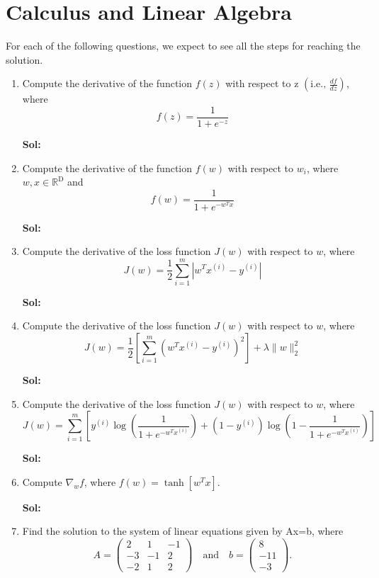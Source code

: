 \documentclass[11pt]{article}
\begin{document}
\section{Calculus and Linear Algebra}

 For each of the following questions, we expect to see all the steps for reaching the solution.
	
\begin{enumerate}
\item Compute the derivative of the function $f(z)$ with respect to z $\left(\text{i.e., }\frac{df}{dz}\right)$, where $$f(z) = \frac{1}{1+e^{-z}}$$

\textbf{Sol:}
  
  \newpage

\item Compute the derivative of the function $f(w)$ with respect to $w_i$, where $w, x \in \mathbb{R}^\text{D}$ and $$f(w) = \frac{1}{1+e^{-w^Tx}}$$

\textbf{Sol:}
  
  \newpage

\item Compute the derivative of the loss function $J(w)$ with respect to $w$, where 
$$ J(w) = \frac{1}{2}\sum_{i=1}^{m} \left|w^{T}x^{(i)} - y^{(i)}\right| $$

\textbf{Sol:}
  
  \newpage

\item Compute the derivative of the loss function $J(w)$ with respect to $w$, where 
$$ J(w) = \frac{1}{2}\left[ \sum_{i=1}^{m} \left(w^{T}x^{(i)} - y^{(i)}\right)^2 \right] + \lambda \|w\|^2_2 $$ 

\textbf{Sol:}
  
  \newpage

\item Compute the derivative of the loss function $J(w)$ with respect to $w$, where 
$$ J(w) = \sum_{i=1}^{m} \left[y^{(i)} \log \left(\frac{1}{1 + e^{-w^{T}x^{(i)}}}\right) + \left(1 - y^{(i)}\right) \log \left(1- \frac{1}{1 + e^{-w^{T}x^{(i)}}}\right)\right] $$

\textbf{Sol:}
  
  \newpage

\item Compute $\nabla_wf$, where $f(w) = \tanh \left[w^Tx\right]$.

\textbf{Sol:}
  
  \newpage
	   
\item Find the solution to the system of linear equations given by Ax=b, where 
$$A = \left(\begin{array}{rrr} 2 & 1 & -1\\ -3 & -1 & 2 \\ -2 & 1 & 2 \end{array}\right) \quad \text{and} \quad b = \left(\begin{array}{r} 8 \\ -11 \\ -3 \end{array}\right).$$


\end{enumerate}
\end{document}
